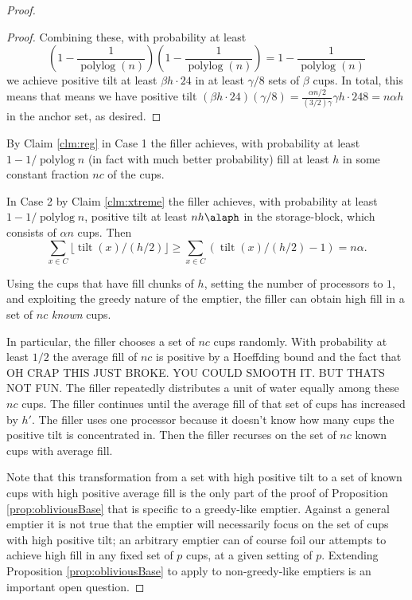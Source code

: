 \documentclass[twocolumn]{article}[10pt]
\DeclareMathOperator{\polylog}{\text{polylog}}
\DeclareMathOperator{\tilt}{\text{tilt}}
\begin{document}
\begin{proof}
\begin{proof}
  Combining these, with probability at least
  $$\left(1-\frac{1}{\polylog(n)}\right)\left(1-\frac{1}{\polylog(n)}\right) =
  1-\frac{1}{\polylog(n)}$$ we achieve positive
  tilt at least $\beta h\cdot 24$ in at least $\gamma/8$ sets of $\beta$ cups. In
  total, this means that means we have positive tilt $(\beta h \cdot 24)(\gamma/8) =
  \frac{\alpha n/2}{(3/2)\gamma}\gamma h \cdot{24}{8} = n\alpha h$ in the anchor set, as desired.

\end{proof}

  By Claim \ref{clm:reg} in Case 1 the filler achieves, with probability at least
  $1-1/\polylog n$ (in fact with much better probability) fill at least $h$ in
  some constant fraction $nc$ of the cups.

  In Case 2 by Claim \ref{clm:xtreme} the filler achieves, with probability at least
  $1-1/\polylog n$, positive tilt at least $nh\alaph$ in the storage-block,
  which consists of $\alpha n$ cups. Then 
  $$\sum_{x\in C} \lfloor \tilt(x) / (h/2) \rfloor \ge \sum_{x\in C} (\tilt(x) / (h/2) -1) = n\alpha.$$

  Using the cups that have fill chunks of $h$, setting the number of processors to $1$, and
  exploiting the greedy nature of the emptier, the filler can obtain high fill
  in a set of $nc$ \emph{known} cups.

  In particular, the filler chooses a set of $nc$ cups randomly.
  With probability at least $1/2$ the average fill of $nc$ is positive by a
  Hoeffding bound and the fact that 
  OH CRAP THIS JUST BROKE. YOU COULD SMOOTH IT. BUT THATS NOT FUN.
  The filler repeatedly distributes a unit of water equally among these $nc$ cups. 
  The filler continues until the average fill of that set of cups has increased
  by $h'$. The filler uses one processor because it doesn't know how many cups
  the positive tilt is concentrated in. Then the filler recurses on the set of
  $nc$ known cups with average fill.

  Note that this transformation from a set with high positive tilt to a set of
  known cups with high positive average fill is the only part of the proof of
  Proposition \ref{prop:obliviousBase} that is specific to a greedy-like
  emptier. Against a general emptier it is not true that the emptier will
  necessarily focus on the set of cups with high positive tilt; an arbitrary
  emptier can of course foil our attempts to achieve high fill in any fixed set
  of $p$ cups, at a given setting of $p$. Extending Proposition
  \ref{prop:obliviousBase} to apply to non-greedy-like emptiers is an important
  open question.
\end{proof}
\end{document}
